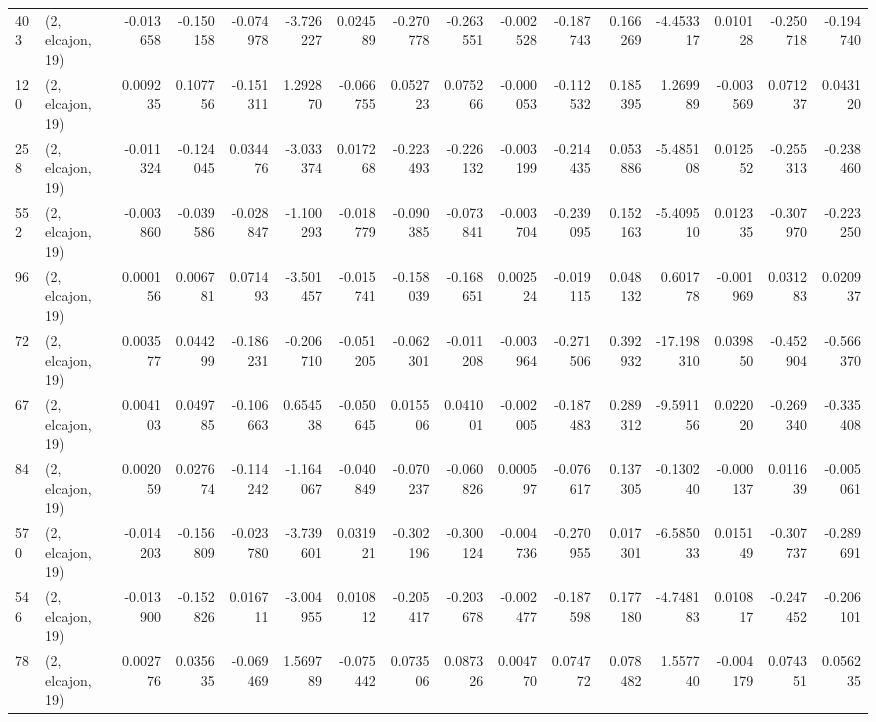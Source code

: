 \begin{tabular}{llrrrrrrrrrrrrrr}
403 &  (2, elcajon, 19) &  -0.013658 & -0.150158 & -0.074978 &   -3.726227 &  0.024589 &  -0.270778 & -0.263551 & -0.002528 & -0.187743 &  0.166269 &   -4.453317 &  0.010128 & -0.250718 & -0.194740 \\
120 &  (2, elcajon, 19) &   0.009235 &  0.107756 & -0.151311 &    1.292870 & -0.066755 &   0.052723 &  0.075266 & -0.000053 & -0.112532 &  0.185395 &    1.269989 & -0.003569 &  0.071237 &  0.043120 \\
258 &  (2, elcajon, 19) &  -0.011324 & -0.124045 &  0.034476 &   -3.033374 &  0.017268 &  -0.223493 & -0.226132 & -0.003199 & -0.214435 &  0.053886 &   -5.485108 &  0.012552 & -0.255313 & -0.238460 \\
552 &  (2, elcajon, 19) &  -0.003860 & -0.039586 & -0.028847 &   -1.100293 & -0.018779 &  -0.090385 & -0.073841 & -0.003704 & -0.239095 &  0.152163 &   -5.409510 &  0.012335 & -0.307970 & -0.223250 \\
96  &  (2, elcajon, 19) &   0.000156 &  0.006781 &  0.071493 &   -3.501457 & -0.015741 &  -0.158039 & -0.168651 &  0.002524 & -0.019115 &  0.048132 &    0.601778 & -0.001969 &  0.031283 &  0.020937 \\
72  &  (2, elcajon, 19) &   0.003577 &  0.044299 & -0.186231 &   -0.206710 & -0.051205 &  -0.062301 & -0.011208 & -0.003964 & -0.271506 &  0.392932 &  -17.198310 &  0.039850 & -0.452904 & -0.566370 \\
67  &  (2, elcajon, 19) &   0.004103 &  0.049785 & -0.106663 &    0.654538 & -0.050645 &   0.015506 &  0.041001 & -0.002005 & -0.187483 &  0.289312 &   -9.591156 &  0.022020 & -0.269340 & -0.335408 \\
84  &  (2, elcajon, 19) &   0.002059 &  0.027674 & -0.114242 &   -1.164067 & -0.040849 &  -0.070237 & -0.060826 &  0.000597 & -0.076617 &  0.137305 &   -0.130240 & -0.000137 &  0.011639 & -0.005061 \\
570 &  (2, elcajon, 19) &  -0.014203 & -0.156809 & -0.023780 &   -3.739601 &  0.031921 &  -0.302196 & -0.300124 & -0.004736 & -0.270955 &  0.017301 &   -6.585033 &  0.015149 & -0.307737 & -0.289691 \\
546 &  (2, elcajon, 19) &  -0.013900 & -0.152826 &  0.016711 &   -3.004955 &  0.010812 &  -0.205417 & -0.203678 & -0.002477 & -0.187598 &  0.177180 &   -4.748183 &  0.010817 & -0.247452 & -0.206101 \\
78  &  (2, elcajon, 19) &   0.002776 &  0.035635 & -0.069469 &    1.569789 & -0.075442 &   0.073506 &  0.087326 &  0.004770 &  0.074772 &  0.078482 &    1.557740 & -0.004179 &  0.074351 &  0.056235 \\

\end{tabular}
